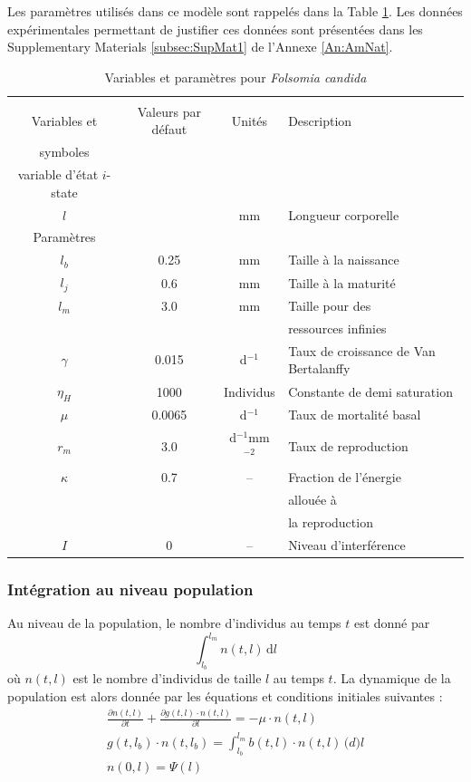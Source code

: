 Les paramètres utilisés dans ce modèle sont rappelés dans la Table
\ref{tab:ANparam}. Les données expérimentales permettant de justifier ces
données sont présentées dans les Supplementary Materials \ref{subsec:SupMat1} de
l'Annexe \ref{An:AmNat}. 

\begin{table}
\caption{\label{tab:ANparam}Variables et paramètres pour \textit{Folsomia
candida}}
\begin{tabular}{cccl}
\hline
\hline 
 & & &\\
 Variables et & Valeurs par défaut & Unités & Description\\ 
symboles & & &\\
\hline
	variable d'état $i$-state  & & & \\ 
	$l$ &   & mm & Longueur corporelle \\ 
	Paramètres & & & \\ 
	$l_{b}$ & 0.25 & mm & Taille à la naissance \\ 
	$l_{j}$ & 0.6 & mm & Taille à la maturité \\ 
	$l_{m}$ & 3.0 & mm & Taille pour des \\
	& & &  ressources infinies \\ 
	$\gamma$ & 0.015 & d$^{-1}$ & Taux de croissance de Van Bertalanffy  \\ 
	$\eta_{H}$ & 1000 & Individus & Constante de demi saturation \\ 
	$\mu$ & 0.0065 & d$^{-1}$ & Taux de mortalité basal \\ 
	$r_{m}$ & 3.0 & d$^{-1}$mm$^{-2}$ & Taux de reproduction \\ 
	$\kappa$ & 0.7 & -- & Fraction de l'énergie \\
	  &   &   & allouée à  \\
	  &   &   & la reproduction \\ 
	  $I$ & 0 & -- & Niveau d'interférence\\
\hline 
\end{tabular} 
\end{table}

\subsubsection{Intégration au niveau population}

Au niveau de la population, le nombre d'individus au temps $t$ est donné par
\begin{equation}
\label{eq_an5}
\int_{l_b}^{l_m}\!n(t,l)\,\mathrm{d}l
\end{equation}
où $n(t,l)$ est le nombre d'individus de taille $l$ au temps $t$. La dynamique
de la population est alors donnée par les équations et conditions initiales
suivantes \autocites{kooijman1984a,de-roos1997a}:
\begin{align}
\label{eq_an6}
\frac{\partial n(t,l)}{\partial t}+\frac{\partial g(t,l) \cdot n(t,l)}{\partial l}=-\mu \cdot n(t,l) \\
g(t,l_b) \cdot n(t,l_b)= \int_{l_b} ^{l_m} \! b(t,l)\cdot n(t,l)\, \mathrm(d)l
\\ n(0,l)=\Psi(l)
\end{align}

